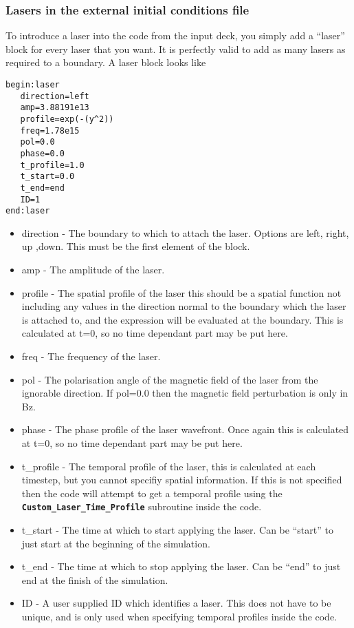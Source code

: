 \documentclass[12pt]{article}
\newcommand{\simpleboxverbatim}{\begin{Verbatim}[obeytabs=true,frame=single,
  framerule=0.5mm,rulecolor=\color{warwickmid}]}
\newcommand{\inlinecode}[1]{{\color{warwickred} \bf\texttt{#1}}}
\begin{document}
\subsubsection{Lasers in the external initial conditions file}
To introduce a laser into the code from the input deck, you simply add a
``laser'' block for every laser that you want. It is perfectly valid to add as
many lasers as required to a boundary. A laser block looks like

\simpleboxverbatim
begin:laser
   direction=left
   amp=3.88191e13
   profile=exp(-(y^2))
   freq=1.78e15
   pol=0.0
   phase=0.0
   t_profile=1.0
   t_start=0.0
   t_end=end
   ID=1
end:laser
\end{Verbatim}

\begin{itemize}
\item direction - The boundary to which to attach the laser. Options are left,
  right, up ,down. This must be the first element of the block.
\item amp - The amplitude of the laser.
\item profile - The spatial profile of the laser this should be a spatial
  function not including any values in the direction normal to the boundary
  which the laser is attached to, and the expression will be evaluated at the
  boundary. This is calculated at t=0, so no time dependant part may be put
  here.
\item freq - The frequency of the laser.
\item pol - The polarisation angle of the magnetic field of the laser from the
  ignorable direction. If pol=0.0 then the magnetic field perturbation is only
  in Bz.
\item phase - The phase profile of the laser wavefront. Once again this is
  calculated at t=0, so no time dependant part may be put here.
\item t\_profile - The temporal profile of the laser, this is calculated at
  each timestep, but you cannot specifiy spatial information. If this is not
  specified then the code will attempt to get a temporal profile using the
  \inlinecode{Custom\_Laser\_Time\_Profile} subroutine inside the code.
\item t\_start - The time at which to start applying the laser. Can be
  ``start'' to just start at the beginning of the simulation.
\item t\_end - The time at which to stop applying the laser. Can be ``end'' to
  just end at the finish of the simulation.
\item ID - A user supplied ID which identifies a laser. This does not have to
  be unique, and is only used when specifying temporal profiles inside the
  code.
\end{itemize}
\end{document}
